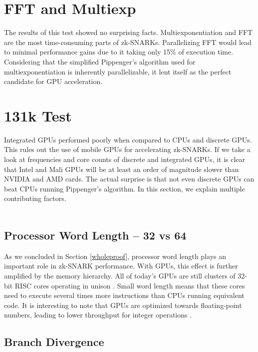 \section{FFT and Multiexp}

The results of this test showed no surprising facts. Multiexponentiation and FFT are the most time-consuming parts of zk-SNARKs. Parallelizing FFT would lead to minimal performance gains due to it taking only 15\% of execution time. Considering that the simplified Pippenger's algorithm used for multiexponentiation is inherently parallelizable, it lent itself as the perfect candidate for GPU acceleration.

\section{131k Test}

Integrated GPUs performed poorly when compared to CPUs and discrete GPUs. This rules out the use of mobile GPUs for accelerating zk-SNARKs. If we take a look at frequencies and core counts of discrete and integrated GPUs, it is clear that Intel and Mali GPUs will be at least an order of magnitude slower than NVIDIA and AMD cards. The actual surprise is that not even discrete GPUs can beat CPUs running Pippenger's algorithm. In this section, we explain multiple contributing factors.\\
\\
\subsection{Processor Word Length -- 32 vs 64}

As we concluded in Section \ref{wholeproof}, processor word length plays an important role in zk-SNARK performance. With GPUs, this effect is further amplified by the memory hierarchy. All of today's GPUs are still clusters of 32-bit RISC cores operating in unison \cite{nvidiapascalinstructions, amdpolarisinstructions}. Small word length means that these cores need to execute several times more instructions than CPUs running equivalent code. It is interesting to note that GPUs are optimized towards floating-point numbers, leading to lower throughput for integer operations \cite{nvidiathroughput}.\\

\subsection{Branch Divergence}

